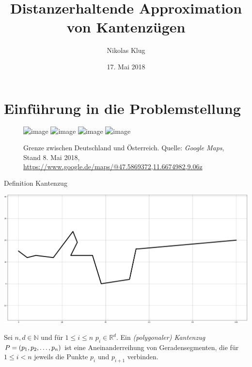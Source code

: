 \documentclass{beamer}
\title[Distanzerhaltende Approximation]{Distanzerhaltende Approximation von Kantenzügen}
\author[N. Klug]{Nikolas Klug}
\institute[Uni Augburg]{Universität Augsburg}
\date{17. Mai 2018}
\begin{document}
	\frame{\titlepage}
	
	\section{Einführung in die Problemstellung}
	\begin{frame}

		\begin{figure}
			\includegraphics<1>[height=0.8\textheight]{maps_zoom1.png}
			\includegraphics<2>[height=0.8\textheight]{maps_zoom2.png}
			\includegraphics<3>[height=0.8\textheight]{maps_zoom3.png}
			\includegraphics<4>[height=0.8\textheight]{maps_zoom4.png}

			\caption{\tiny{Grenze zwischen Deutschland und Österreich. Quelle: \emph{Google Maps}, Stand 8. Mai 2018, \href{https://www.google.de/maps/@47.5869372,11.6674982,9.06z}{https://www.google.de/maps/@47.5869372,11.6674982,9.06z}}}
		\end{figure}
		
	\end{frame}
	
	\begin{frame}{Definition Kantenzug}

		\centering
		\includegraphics[height=0.6\textheight]{raw_path.png}
		
		\begin{definition}
			Sei $n, d \in \mathbb{N}$ und für $1 \leq i \leq n$ $p_i \in \mathbb{R}^d$.
			Ein \emph{(polygonaler) Kantenzug} $P = (p_1, p_2, \mathellipsis, p_n)$ ist eine Aneinanderreihung von Geradensegmenten, die für $1 \leq i < n$ jeweils die Punkte $p_i$ und $p_{i+1}$ verbinden. 

		\end{definition}
	\end{frame}
	
\end{document}
